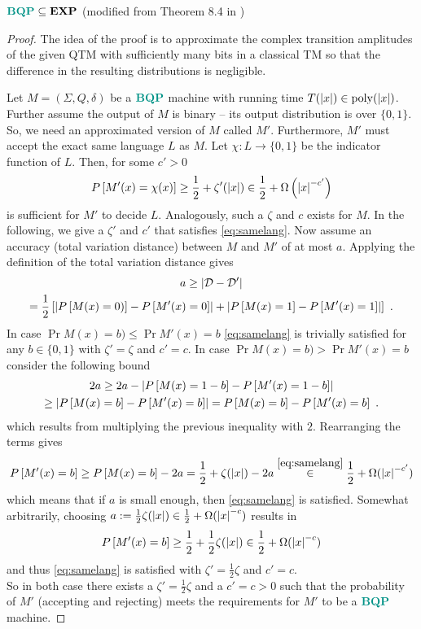 \begin{theorem}
\label{th:bqpexp}
$\BQP\subseteq\EXP$ (modified from Theorem 8.4 in \cite{bernstein_vazirani_1997})

\begin{proof}
The idea of the proof is to approximate the complex transition amplitudes of the given \ac{QTM} with sufficiently many bits in a classical \ac{TM} so that the difference in the resulting distributions is negligible.

Let $M=(\Sigma, Q, \delta)$ be a $\BQP$ machine with running time $T(\left\vert x\right\vert)\in\mathrm{poly}(\left\vert x\right\vert)$.
Further assume the output of $M$ is binary -- its output distribution is over $\{0,1\}$.
So, we need an approximated version of $M$ called $M'$.
Furthermore, $M'$ must accept the exact same language $L$ as $M$.
Let $\chi:L\to\{0,1\}$ be the indicator function of $L$.
Then, for some $c'>0$
\begin{equation}
\label{eq:samelang}
    P\left[M'(x)=\chi(x)\right]
    \geq\frac{1}{2}+\zeta'(\left\vert x\right\vert)
    \in\frac{1}{2}+\Omega\left(\left\vert x\right\vert^{-c'}\right)
\end{equation}
is sufficient for $M'$ to decide $L$.
Analogously, such a $\zeta$ and $c$ exists for $M$.
In the following, we give a $\zeta'$ and $c'$ that satisfies \cref{eq:samelang}.
Now assume an accuracy (total variation distance) between $M$ and $M'$ of at most $a$.
Applying the definition of the total variation distance gives
\begin{multline}
    a
    \geq\left\vert\mathcal{D}-\mathcal{D}'\right\vert
    \\
    =\frac{1}{2}\left[\left\vert P\left[M(x)=0)\right]-P\left[M'(x)=0\right]\right\vert+\left\vert P\left[M(x)=1\right]-P\left[M'(x)=1\right]\right\vert\right]
    \ .
\end{multline}
In case $\Pr{M(x)=b)}\leq\Pr{M'(x)=b}$ \cref{eq:samelang} is trivially satisfied for any $b\in\{0,1\}$ with $\zeta'=\zeta$ and $c'=c$.
In case $\Pr{M(x)=b)}>\Pr{M'(x)=b}$ consider the following bound
\begin{multline}
    2a
    \geq 2a-\left\vert P\left[M(x)=1-b\right]-P\left[M'(x)=1-b\right]\right\vert
    \\
    \geq\left\vert P\left[M(x)=b\right]-P\left[M'(x)=b\right]\right\vert
    =P\left[M(x)=b\right]-P\left[M'(x)=b\right]
    \ .
\end{multline}
which results from multiplying the previous inequality with $2$.
Rearranging the terms gives
\begin{equation}
    P\left[M'(x)=b\right]
    \geq P\left[M(x)=b\right]-2a
    =\frac{1}{2}+\zeta(\left\vert x\right\vert)-2a
    \overset{\eqref{eq:samelang}}{\in}\frac{1}{2}+\Omega(\left\vert x\right\vert^{-c'})
\end{equation}
which means that if $a$ is small enough, then \cref{eq:samelang} is satisfied.
Somewhat arbitrarily, choosing $a:=\frac{1}{2}\zeta(\left\vert x\right\vert)\in\frac{1}{2}+\Omega(\left\vert x\right\vert^{-c})$ results in
\begin{equation}
    P\left[M'(x)=b\right]
    \geq\frac{1}{2}+\frac{1}{2}\zeta(\left\vert x\right\vert)
    \in\frac{1}{2}+\Omega(\left\vert x\right\vert^{-c})
\end{equation}
and thus \cref{eq:samelang} is satisfied with $\zeta'=\frac{1}{2}\zeta$ and $c'=c$.
\\
So in both case there exists a $\zeta'=\frac{1}{2}\zeta$ and a $c'=c>0$ such that the probability of $M'$ (accepting and rejecting) meets the requirements for $M'$ to be a $\BQP$ machine.


\end{proof}
\end{theorem}
